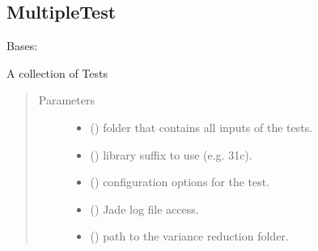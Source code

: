 \documentclass[letterpaper,10pt,english]{sphinxmanual}
\begin{document}
\subsection{MultipleTest}
\label{\detokenize{api/inputgeneration:multipletest}}\label{\detokenize{api/inputgeneration:multitestob}}

\begin{fulllineitems}
\label{\detokenize{api/inputgeneration:testrun.MultipleTest}}
Bases: 

A collection of Tests
\begin{quote}\begin{description}
\item[{Parameters}] \leavevmode\begin{itemize}
\item {} 
 () \textendash{} folder that contains all inputs of the tests.

\item {} 
 () \textendash{} library suffix to use (e.g. 31c).

\item {} 
 (\sphinxstyleliteralemphasis{\sphinxupquote{ (}}\sphinxstyleliteralemphasis{\sphinxupquote{)}}) \textendash{} configuration options for the test.

\item {} 
 () \textendash{} Jade log file access.

\item {} 
 () \textendash{} path to the variance reduction folder.


\end{itemize}
\end{description}
\end{quote}
\end{fulllineitems}
\end{document}
